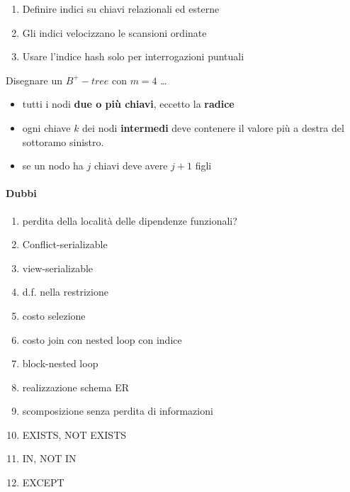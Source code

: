 \documentclass{exam}
\begin{document}
\begin{questions}
\begin{solution}
\begin{enumerate}
        \item Definire indici su chiavi relazionali ed esterne  
        \item Gli indici velocizzano le scansioni ordinate  
        \item Usare l'indice hash solo per interrogazioni puntuali 
        \end{enumerate}
    \end{solution}
    \question Disegnare un $B^+-tree$ con $m=4$ \dots
    \begin{solution}
        \begin{itemize}
            \item tutti i nodi \textbf{due o più chiavi}, eccetto la \textbf{radice}
            \item ogni chiave $k$ dei nodi \textbf{intermedi} deve contenere il valore più a destra del sottoramo sinistro.
            \item se un nodo ha $j$ chiavi deve avere $j+1$ figli
        \end{itemize}
    \end{solution}
\end{questions}



\paragraph{Dubbi}
\begin{enumerate}
    \item perdita della località delle dipendenze funzionali?
    \item Conflict-serializable
    \item view-serializable
    \item d.f. nella restrizione
    \item costo selezione
    \item costo join con nested loop con indice
    \item block-nested loop
    \item realizzazione schema ER
    \item scomposizione senza perdita di informazioni
    \item EXISTS, NOT EXISTS
    \item IN, NOT IN
    \item EXCEPT
\end{enumerate}
\end{document}
